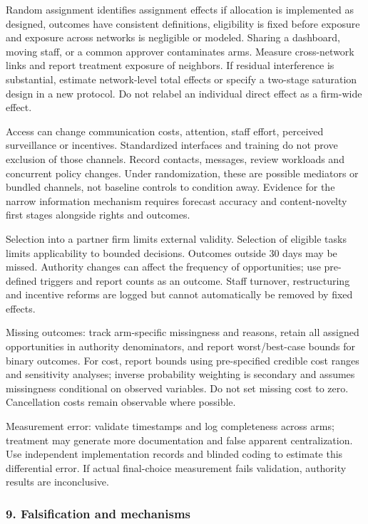 \documentclass[
  11pt,
]{article}
\begin{document}
Random assignment identifies assignment effects if allocation is
implemented as designed, outcomes have consistent definitions,
eligibility is fixed before exposure and exposure across networks is
negligible or modeled. Sharing a dashboard, moving staff, or a common
approver contaminates arms. Measure cross-network links and report
treatment exposure of neighbors. If residual interference is
substantial, estimate network-level total effects or specify a two-stage
saturation design in a new protocol. Do not relabel an individual direct
effect as a firm-wide effect.

Access can change communication costs, attention, staff effort,
perceived surveillance or incentives. Standardized interfaces and
training do not prove exclusion of those channels. Record contacts,
messages, review workloads and concurrent policy changes. Under
randomization, these are possible mediators or bundled channels, not
baseline controls to condition away. Evidence for the narrow information
mechanism requires forecast accuracy and content-novelty first stages
alongside rights and outcomes.

Selection into a partner firm limits external validity. Selection of
eligible tasks limits applicability to bounded decisions. Outcomes
outside 30 days may be missed. Authority changes can affect the
frequency of opportunities; use pre-defined triggers and report counts
as an outcome. Staff turnover, restructuring and incentive reforms are
logged but cannot automatically be removed by fixed effects.

Missing outcomes: track arm-specific missingness and reasons, retain all
assigned opportunities in authority denominators, and report
worst/best-case bounds for binary outcomes. For cost, report bounds
using pre-specified credible cost ranges and sensitivity analyses;
inverse probability weighting is secondary and assumes missingness
conditional on observed variables. Do not set missing cost to zero.
Cancellation costs remain observable where possible.

Measurement error: validate timestamps and log completeness across arms;
treatment may generate more documentation and false apparent
centralization. Use independent implementation records and blinded
coding to estimate this differential error. If actual final-choice
measurement fails validation, authority results are inconclusive.

\subsubsection{9. Falsification and
mechanisms}\label{falsification-and-mechanisms}
\end{document}
